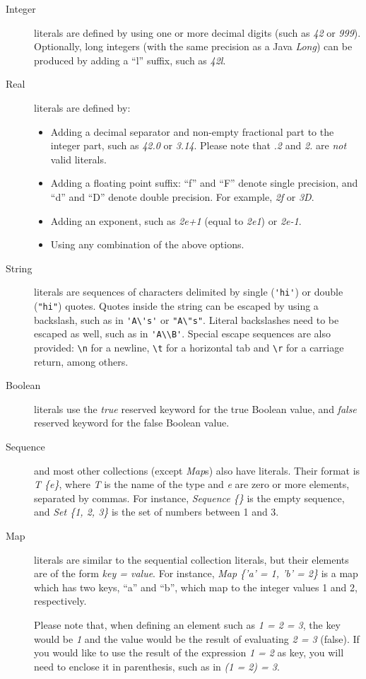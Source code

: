 \begin{description}
\item[Integer] literals are defined by using one or more decimal
  digits (such as \emph{42} or \emph{999}). Optionally, long integers
  (with the same precision as a Java \emph{Long}) can be produced by
  adding a ``l'' suffix, such as \emph{42l}.

\item[Real] literals are defined by:
  \begin{itemize}
  \item Adding a decimal separator and non-empty fractional part to
    the integer part, such as \emph{42.0} or \emph{3.14}. Please note
    that \emph{.2} and \emph{2.} are \emph{not} valid literals.
  \item Adding a floating point suffix: ``f'' and ``F'' denote single
    precision, and ``d'' and ``D'' denote double precision. For
    example, \emph{2f} or \emph{3D}.
  \item Adding an exponent, such as \emph{2e+1} (equal to \emph{2e1})
    or \emph{2e-1}.
  \item Using any combination of the above options.
  \end{itemize}

\item[String] literals are sequences of characters delimited by single
  (\verb#'hi'#) or double (\verb#"hi"#) quotes. Quotes inside the
  string can be escaped by using a backslash, such as in \verb#'A\'s'#
  or \verb#"A\"s"#. Literal backslashes need to be escaped as well,
  such as in \verb#'A\\B'#. Special escape sequences are also
  provided: \verb#\n# for a newline, \verb#\t# for a horizontal tab
  and \verb#\r# for a carriage return, among others.

\item[Boolean] literals use the \emph{true} reserved keyword for the
  true Boolean value, and \emph{false} reserved keyword for the false
  Boolean value.

\item[Sequence] and most other collections (except \emph{Map}s) also
  have literals. Their format is \emph{T \{e\}}, where \emph{T} is the
  name of the type and \emph{e} are zero or more elements, separated
  by commas. For instance, \emph{Sequence \{\}} is the empty sequence,
  and \emph{Set \{1, 2, 3\}} is the set of numbers between 1 and 3.

\item[Map] literals are similar to the sequential collection literals,
  but their elements are of the form \emph{key = value}. For instance,
  \emph{Map \{'a' = 1, 'b' = 2\}} is a map which has two keys, ``a''
  and ``b'', which map to the integer values 1 and 2, respectively.

  Please note that, when defining an element such as \emph{1 = 2 = 3},
  the key would be \emph{1} and the value would be the result of
  evaluating \emph{2 = 3} (false). If you would like to use the result
  of the expression \emph{1 = 2} as key, you will need to enclose it
  in parenthesis, such as in \emph{(1 = 2) = 3}.

\end{description}

